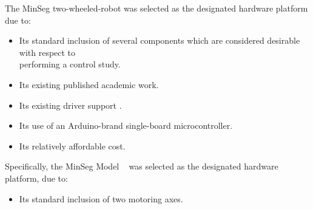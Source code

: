 \documentclass[crop=false,float=true,class=scrreprt]{standalone}
\begin{document}
The MinSeg two-wheeled-robot was selected as the designated hardware platform due to:


\begin{itemize}[leftmargin=*]

\item Its standard inclusion of several components which are considered desirable with respect to \\
      performing a control study.

\item Its existing published academic work.
      \\

\item Its existing driver support {}.

\item Its use of an Arduino-brand single-board microcontroller.\\

\item Its relatively affordable cost.
\end{itemize}


\vspace*{+2em}


Specifically, the MinSeg Model ~%
\cite{REF:online:minseg:m2v3}
was selected as the designated hardware platform, due to:

\begin{itemize}[leftmargin=*]

\item Its standard inclusion of two {} motoring axes.\\[+0.25em]


\end{itemize}
\end{document}
